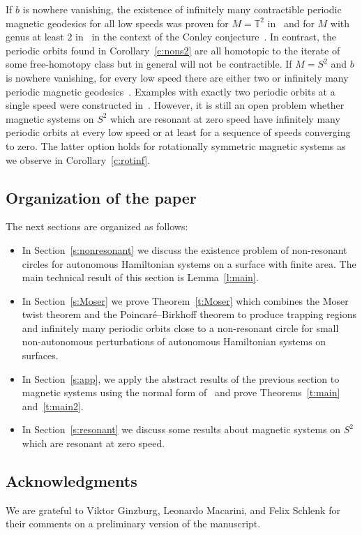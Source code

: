 \documentclass[10pt]{amsart}
\theoremstyle{definition}
\newcommand{\T}{\mathbb{T}}
\begin{document}
If $b$ is nowhere vanishing, the existence of infinitely many contractible periodic magnetic geodesics for all low speeds was proven for $M=\T^2$ in~\cite{Ginzburg:2009} and for $M$ with genus at least $2$ in~\cite{Ginzburg:2014ws} in the context of the Conley conjecture~\cite{Ginzburg:2015}. In contrast, the periodic orbits found in Corollary~\ref{c:nons2} are all homotopic to the iterate of some free-homotopy class but in general will not be contractible. If $M=S^2$ and $b$ is nowhere vanishing, for every low speed there are either two or infinitely many periodic magnetic geodesics~\cite{Benedetti:2014}. Examples with exactly two periodic orbits at a single speed were constructed in~\cite{Benedetti:2016}. However, it is still an open problem whether magnetic systems on $S^2$ which are resonant at zero speed have infinitely many periodic orbits at every low speed or at least for a sequence of speeds converging to zero. The latter option holds for rotationally symmetric magnetic systems as we observe in Corollary~\ref{c:rotinf}.

\subsection*{Organization of the paper}

The next sections are organized as follows:
\begin{itemize}
\item In Section~\ref{s:nonresonant} we discuss the existence problem of non-resonant circles for autonomous Hamiltonian systems on a surface with finite area. The main technical result of this section is Lemma~\ref{l:main}.
\item In Section~\ref{s:Moser} we prove Theorem~\ref{t:Moser} which combines the Moser twist theorem and the Poincaré--Birkhoff theorem to produce trapping regions and infinitely many periodic orbits close to a non-resonant circle for small non-autonomous perturbations of autonomous Hamiltonian systems on surfaces.
\item In Section~\ref{s:app}, we apply the abstract results of the previous section to magnetic systems using the normal form of~\cite{AB21,Castilho:2001} and prove Theorems~\ref{t:main} and~\ref{t:main2}.
\item In Section~\ref{s:resonant} we discuss some results about magnetic systems on $S^2$ which are resonant at zero speed.
\end{itemize}

\subsection*{Acknowledgments}
We are grateful to Viktor Ginzburg, Leonardo Macarini, and Felix Schlenk for their comments on a preliminary version of the manuscript.
\end{document}
